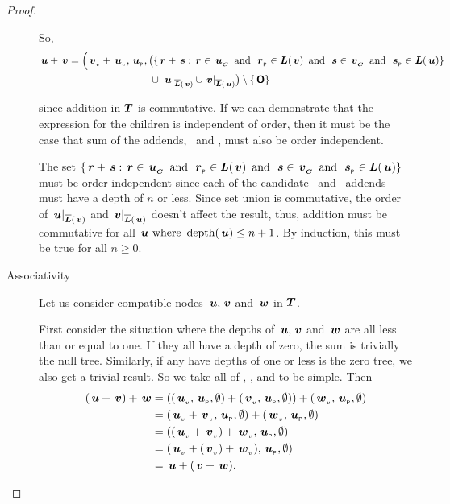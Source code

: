 \begin{proposition}
\begin{proof}
\begin{description}
      So,
      \begin{align*}
          \node{u} + \node{v} &= \Bigl(\nv{v} + \nv{u}, \nlabel{u}, \bigl(\{\node{r}+\node{s} : \node{r} \in \child{u} \mand \nlabel{r} \in \nlabels{v} \mand \node{s} \in \child{v}\mand\nlabel{s} \in \nlabels{u}\} \notag\\
          & \qquad \qquad \qquad \qquad         \cup \nrestrictedto{\node{u}}{v} \cup \nrestrictedto{v}{u}\bigr) \setminus \{\zerotree\}
      \end{align*}

      since addition in $\DOM$ is commutative. If we can demonstrate
      that the expression for the children is independent of
      order, then it must be the case that sum of the addends,
      \ and , must also be order independent.
      
      The set \(\{\node{r}+\node{s}:\node{r}\in\child{u}\mand\nlabel{r}\in\nlabels{v}\mand\node{s}\in\child{v}\mand\nlabel{s}\in\nlabels{u}\}\) must be
      order independent since each of the candidate \ and \ addends must have a depth of \(n\) or less. Since set union is
      commutative, the order of \(\nrestrictedto{u}{v}\) and \(\nrestrictedto{v}{u}\) doesn't affect the result, thus, addition must be commutative
      for all \(\node{u} \text{ where } \depth({\node{u}}) \leq n+1\).  By induction, this must be true for all \(n \geq 0\).

    \item[Associativity]\label{additiveassociativity}

      Let us consider compatible nodes \(\node{u}, \node{v}\) and
      \(\node{w}\) in $\DOM$. 

      First consider the situation where the depths of \(\node{u},
      \node{v}\) and \(\node{w}\) are all less than or equal to
      one. If they all have a depth of zero, the sum is trivially the
      null tree. Similarly, if any have depths of one or less is the
      zero tree, we also get a trivial result. So we take all of
      , , and  to be simple. Then
      \begin{align*}
          (\node{u}+\node{v})+\node{w} &= ((\nv{u}, \nlabel{u}, \emptyset) + (\nv{v}, \nlabel{u}, \emptyset)) + (\nv{w}, \nlabel{u}, \emptyset) \\
          &= (\nv{u} + \nv{v}, \nlabel{u}, \emptyset) + (\nv{w}, \nlabel{u}, \emptyset) \\
          &= ((\nv{u} + \nv{v}) + \nv{w}, \nlabel{u}, \emptyset) \\
          &= (\nv{u} + (\nv{v}) + \nv{w}), \nlabel{u}, \emptyset) \\
          &= \node{u} + (\node{v} + \node{w}).
      \end{align*}
      

\end{description}
\end{proof}
\end{proposition}
